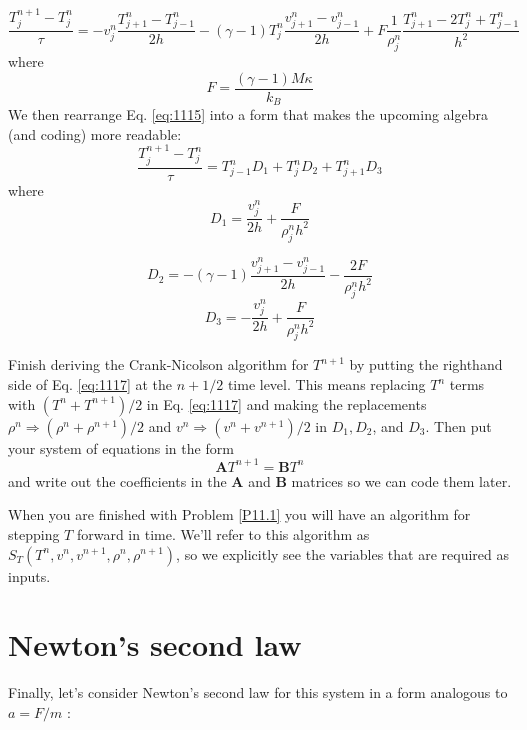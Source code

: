 \begin{equation}\label{eq:1115}
\frac{T_{j}^{n+1}-T_{j}^{n}}{\tau}=-v_{j}^{n} \frac{T_{j+1}^{n}-T_{j-1}^{n}}{2 h}-(\gamma-1) T_{j}^{n} \frac{v_{j+1}^{n}-v_{j-1}^{n}}{2 h}+F \frac{1}{\rho_{j}^{n}} \frac{T_{j+1}^{n}-2 T_{j}^{n}+T_{j-1}^{n}}{h^{2}}
\end{equation}
where
\begin{equation}\label{eq:1116}
F=\frac{(\gamma-1) M \kappa}{k_{B}}
\end{equation}
We then rearrange Eq. \ref{eq:1115} into a form that makes the upcoming algebra (and
coding) more readable:
\begin{equation}\label{eq:1117}
\frac{T_{j}^{n+1}-T_{j}^{n}}{\tau}=T_{j-1}^{n} D_{1}+T_{j}^{n} D_{2}+T_{j+1}^{n} D_{3}
\end{equation}
where
\begin{equation}\label{eq:1118}
D_{1}=\frac{v_{j}^{n}}{2 h}+\frac{F}{\rho_{j}^{n} h^{2}}
\end{equation}

\begin{equation}\label{eq:1119}
D_{2}=-(\gamma-1) \frac{v_{j+1}^{n}-v_{j-1}^{n}}{2 h}-\frac{2 F}{\rho_{j}^{n} h^{2}}
\end{equation}
\begin{equation}\label{eq:1120}
D_{3}=-\frac{v_{j}^{n}}{2 h}+\frac{F}{\rho_{j}^{n} h^{2}}
\end{equation}
\begin{problem}\label{P11.1}
Finish deriving the Crank-Nicolson algorithm for $T^{n+1}$ by putting the righthand side of Eq. \ref{eq:1117} at the $n+1 / 2$ time level. This means replacing $T^{n}$ terms with $\left(T^{n}+T^{n+1}\right) / 2$ in Eq. \ref{eq:1117} and making the replacements $\rho^{n} \Rightarrow\left(\rho^{n}+\rho^{n+1}\right) / 2$ and $v^{n} \Rightarrow\left(v^{n}+v^{n+1}\right) / 2$ in $D_{1}, D_{2}$, and $D_{3}$. Then put your system of equations in the form
\begin{equation*}
\mathbf{A} T^{n+1}=\mathbf{B} T^{n}
\end{equation*}
and write out the coefficients in the $\mathbf{A}$ and $\mathbf{B}$ matrices so we can code them later.\end{problem}
When you are finished with Problem \ref{P11.1} you will have an algorithm for stepping $T$ forward in time. We'll refer to this algorithm as $S_{T}\left(T^{n}, v^{n}, v^{n+1}, \rho^{n}, \rho^{n+1}\right)$, so we explicitly see the variables that are required as inputs.
\section*{Newton\rq s second law}
Finally, let\rq s consider Newton\rq s second law for this system in a form analogous to $a=F / m$ :

